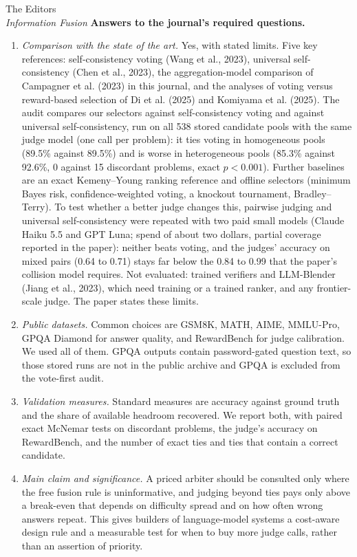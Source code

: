 \documentclass[11pt]{letter}
\begin{document}
\begin{letter}{The Editors \\ \emph{Information Fusion}}
\vspace{4pt}
\textbf{Answers to the journal's required questions.}
\begin{enumerate}[leftmargin=*,itemsep=3pt]
\item \emph{Comparison with the state of the art.} Yes, with stated limits. Five key references: self-consistency voting (Wang et al., 2023), universal self-consistency (Chen et al., 2023), the aggregation-model comparison of Campagner et al. (2023) in this journal, and the analyses of voting versus reward-based selection of Di et al. (2025) and Komiyama et al. (2025). The audit compares our selectors against self-consistency voting and against universal self-consistency, run on all 538 stored candidate pools with the same judge model (one call per problem): it ties voting in homogeneous pools (89.5\% against 89.5\%) and is worse in heterogeneous pools (85.3\% against 92.6\%, 0 against 15 discordant problems, exact $p<0.001$). Further baselines are an exact Kemeny--Young ranking reference and offline selectors (minimum Bayes risk, confidence-weighted voting, a knockout tournament, Bradley--Terry). To test whether a better judge changes this, pairwise judging and universal self-consistency were repeated with two paid small models (Claude Haiku 5.5 and GPT Luna; spend of about two dollars, partial coverage reported in the paper): neither beats voting, and the judges' accuracy on mixed pairs (0.64 to 0.71) stays far below the 0.84 to 0.99 that the paper's collision model requires. Not evaluated: trained verifiers and LLM-Blender (Jiang et al., 2023), which need training or a trained ranker, and any frontier-scale judge. The paper states these limits.
\item \emph{Public datasets.} Common choices are GSM8K, MATH, AIME, MMLU-Pro, GPQA Diamond for answer quality, and RewardBench for judge calibration. We used all of them. GPQA outputs contain password-gated question text, so those stored runs are not in the public archive and GPQA is excluded from the vote-first audit.
\item \emph{Validation measures.} Standard measures are accuracy against ground truth and the share of available headroom recovered. We report both, with paired exact McNemar tests on discordant problems, the judge's accuracy on RewardBench, and the number of exact ties and ties that contain a correct candidate.
\item \emph{Main claim and significance.} A priced arbiter should be consulted only where the free fusion rule is uninformative, and judging beyond ties pays only above a break-even that depends on difficulty spread and on how often wrong answers repeat. This gives builders of language-model systems a cost-aware design rule and a measurable test for when to buy more judge calls, rather than an assertion of priority.

\end{enumerate}
\end{letter}
\end{document}
